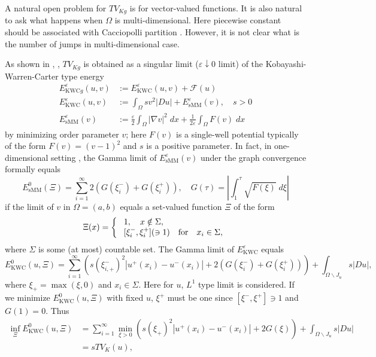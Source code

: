 \documentclass[11pt]{amsart} %
\numberwithin{equation}{section}
\begin{document}
A natural open problem for $TV_{Kg}$ is for vector-valued functions.
 It is also natural to ask what happens when $\Omega$ is multi-dimensional.
 Here piecewise constant should be associated with Cacciopolli partition \cite{AFP}.
 However, it is not clear what is the number of jumps in multi-dimensional case.

As shown in \cite{GOU}, \cite{GOSU}, $TV_{Kg}$ is obtained as a singular limit ($\varepsilon\downarrow0$ limit) of the Kobayashi-Warren-Carter type energy  \cite{KWC1,KWC2,WKC}
\begin{align*}
	E_{\mathrm{KWC}g}^\varepsilon (u,v) &:= E_{\mathrm{KWC}}^\varepsilon (u,v) + \mathcal{F}(u) \\
	E_{\mathrm{KWC}}^\varepsilon (u,v) &:= \int_\Omega sv^2 |Du| + E_{\mathrm{sMM}}^\varepsilon (v), \quad s>0 \\
	E_{\mathrm{sMM}}^\varepsilon (v) &:= \frac{\varepsilon}{2} \int_\Omega |\nabla v|^2\; dx
	+ \frac{1}{2\varepsilon} \int_\Omega F(v)\; dx
\end{align*}
by minimizing order parameter $v$; here $F(v)$ is a single-well potential typically of the form $F(v)=(v-1)^2$ and $s$ is a positive parameter.
 In fact, in one-dimensional setting \cite{GOU}, the Gamma limit of $E_{\mathrm{sMM}}^\varepsilon (v)$ under the graph convergence formally equals
\[
	E_{\mathrm{sMM}}^0 (\Xi)
	= \sum_{i=1}^\infty 2 \left( G(\xi_i^-) + G(\xi_i^+) \right), \quad
	G(\tau) = \left| 
	\int_1^\tau \sqrt{F(\xi)}\; d\xi \right|
\]
if the limit of $v$ in $\Omega=(a,b)$ equals a set-valued function $\Xi$ of the form
\[
	\Xi(x) = \left\{
\begin{array}{ll}
	&\hspace{-0.7em}1, \quad x \notin \Sigma, \\
	&\hspace{-0.7em}[\xi_i^-, \xi_i^+] (\ni 1) \quad\text{for}\quad x_i \in \Sigma,
\end{array}
\right.
\]
where $\Sigma$ is some (at most) countable set.
 The Gamma limit of $E_{\mathrm{KWC}}^\varepsilon$ 
equals
\[
	E_{\mathrm{KWC}}^0(u,\Xi) = \sum_{i=1}^\infty \left( s(\xi_{i,+}^-)^2 \left|u^+(x_i)-u^-(x_i)\right|
	+ 2 \left( G(\xi_i^-) + G(\xi_i^+)\right) \right)
	+ \int_{\Omega\backslash J_u} s|Du|,
\]
where $\xi_+=\max(\xi,0)$ and $x_i\in\Sigma$.
 Here for $u$, $L^1$ type limit is considered.
 If we minimize $E_{\mathrm{KWC}}^0(u,\Xi)$ with fixed $u$, $\xi^+$ must be one since $[\xi^-,\xi^+]\ni1$ and $G(1)=0$.
 Thus
\begin{align*}
	\inf_\Xi E_{\mathrm{KWC}}^0(u,\Xi)
	&= \sum_{i=1}^\infty \min_{\xi>0} \left( s(\xi_+)^2 \left|u^+(x_i) - u^-(x_i)\right| + 2G(\xi) \right)
	+ \int_{\Omega\backslash J_u} s |Du| \\
	&= sTV_K(u),
\end{align*}
\end{document}
